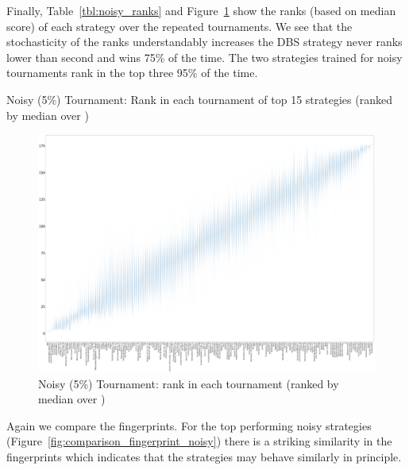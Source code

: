\documentclass{article}
\begin{document}
Finally, Table~\ref{tbl:noisy_ranks} and
Figure~\ref{fig:noisy_ranks_boxplot} show the ranks (based on median score)
of each strategy over the repeated tournaments. We see that the stochasticity
of the ranks understandably increases the DBS strategy never ranks lower than
second and wins 75\% of the time. The two strategies trained for noisy
tournaments rank in the top three 95\% of the time.

\begin{table}[!hbtp]
    \centering
        
        \caption{Noisy (5\%) Tournament: Rank in each tournament
        of top 15 strategies (ranked by median over
        \protecttournaments)}
        \label{tbl:noisy_ranks}
\end{table}

\begin{landscape}
    \begin{figure}[!hbtp]
        \centering
        \includegraphics[width=\paperwidth]{./assets/noisy_ranks_boxplots.pdf}
        \caption{Noisy (5\%) Tournament: rank in each tournament (ranked by
        median over
        \protecttournaments)}
        \label{fig:noisy_ranks_boxplot}
    \end{figure}
\end{landscape}

Again we compare the fingerprints. For the top performing noisy strategies
(Figure~\ref{fig:comparison_fingerprint_noisy}) there
is a striking similarity in the fingerprints which indicates that the strategies
may behave similarly in principle.
\end{document}
